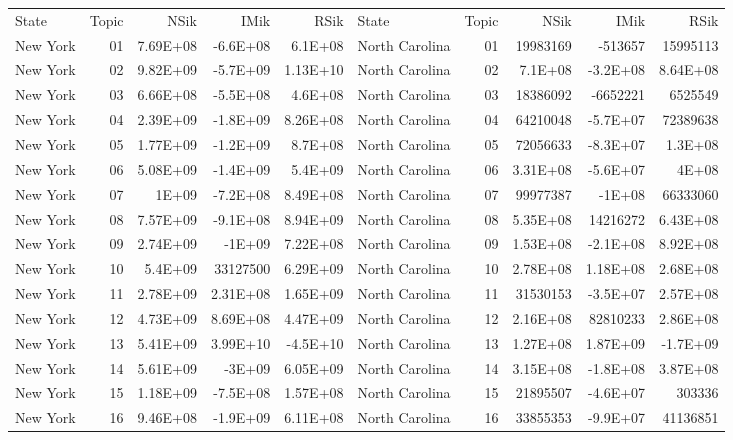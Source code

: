 \begin{table}[]
	\footnotesize
	\begin{tabular}{lrrrrlrrrr}
	State & Topic & NSik & IMik & RSik & State & Topic & NSik & IMik & RSik \\
		New York &  01  & 7.69E+08 & -6.6E+08 & 6.1E+08 & North Carolina &  01  & 19983169 & -513657 & 15995113 \\
		New York &  02  & 9.82E+09 & -5.7E+09 & 1.13E+10 & North Carolina &  02  & 7.1E+08 & -3.2E+08 & 8.64E+08 \\
		New York &  03  & 6.66E+08 & -5.5E+08 & 4.6E+08 & North Carolina &  03  & 18386092 & -6652221 & 6525549 \\
		New York &  04  & 2.39E+09 & -1.8E+09 & 8.26E+08 & North Carolina &  04  & 64210048 & -5.7E+07 & 72389638 \\
		New York &  05  & 1.77E+09 & -1.2E+09 & 8.7E+08 & North Carolina &  05  & 72056633 & -8.3E+07 & 1.3E+08 \\
		New York &  06  & 5.08E+09 & -1.4E+09 & 5.4E+09 & North Carolina &  06  & 3.31E+08 & -5.6E+07 & 4E+08 \\
		New York &  07  & 1E+09 & -7.2E+08 & 8.49E+08 & North Carolina &  07  & 99977387 & -1E+08 & 66333060 \\
		New York &  08  & 7.57E+09 & -9.1E+08 & 8.94E+09 & North Carolina &  08  & 5.35E+08 & 14216272 & 6.43E+08 \\
		New York &  09  & 2.74E+09 & -1E+09 & 7.22E+08 & North Carolina &  09  & 1.53E+08 & -2.1E+08 & 8.92E+08 \\
		New York &  10 & 5.4E+09 & 33127500 & 6.29E+09 & North Carolina &  10 & 2.78E+08 & 1.18E+08 & 2.68E+08 \\
		New York &  11 & 2.78E+09 & 2.31E+08 & 1.65E+09 & North Carolina &  11 & 31530153 & -3.5E+07 & 2.57E+08 \\
		New York &  12 & 4.73E+09 & 8.69E+08 & 4.47E+09 & North Carolina &  12 & 2.16E+08 & 82810233 & 2.86E+08 \\
		New York &  13 & 5.41E+09 & 3.99E+10 & -4.5E+10 & North Carolina &  13 & 1.27E+08 & 1.87E+09 & -1.7E+09 \\
		New York &  14 & 5.61E+09 & -3E+09 & 6.05E+09 & North Carolina &  14 & 3.15E+08 & -1.8E+08 & 3.87E+08 \\
		New York &  15 & 1.18E+09 & -7.5E+08 & 1.57E+08 & North Carolina &  15 & 21895507 & -4.6E+07 & 303336 \\
		New York &  16 & 9.46E+08 & -1.9E+09 & 6.11E+08 & North Carolina &  16 & 33855353 & -9.9E+07 & 41136851 \\

\end{tabular}
\end{table}

